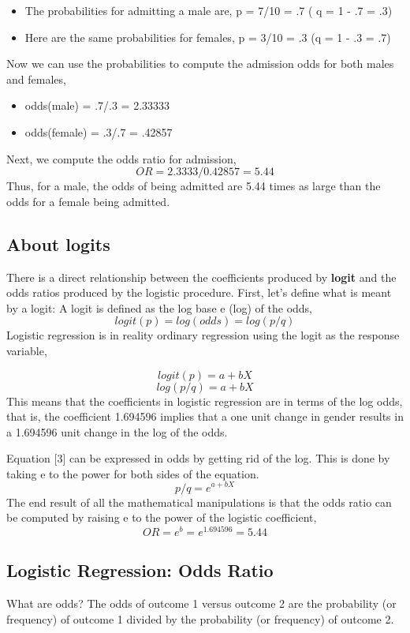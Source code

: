 \documentclass[12pt]{article}
\begin{document}
\begin{itemize}
\item The probabilities for admitting a male are,
p = 7/10 = .7      ( q = 1 - .7 = .3)
\item Here are the same probabilities for females,
p = 3/10 = .3       (q = 1 - .3 = .7)
\end{itemize}
Now we can use the probabilities to compute the admission odds for both males and females,
\begin{itemize}
\item odds(male) = .7/.3 = 2.33333
\item odds(female) = .3/.7 = .42857
\end{itemize}
Next, we compute the odds ratio for admission,
\[OR = 2.3333/0.42857 = 5.44\]
Thus, for a male, the odds of being admitted are 5.44 times as large than the odds for a female being admitted.

\subsection{About logits}


There is a direct relationship between the coefficients produced by \textbf{logit} and the odds ratios produced by the logistic procedure.  First, let's define what is meant by a logit:  A logit is defined as the log base e (log) of the odds,
\[logit(p) = log(odds) = log(p/q)\]
Logistic regression is in reality ordinary regression using the logit as the response variable,

\[logit(p) = a + bX\]
\[log(p/q) = a + bX\]
This means that the coefficients in logistic regression are in terms of the log odds, that is, the coefficient 1.694596 implies that a one unit change in gender results in a 1.694596 unit change in the log of the odds.  

Equation [3] can be expressed in odds by getting rid of the log.  This is done by taking e to the power for both sides of the equation.
\[ p/q = e^{a + bX}\]
The end result of all the mathematical manipulations is that the odds ratio can be computed by raising e to the power of the logistic coefficient,
   \[OR = e^b = e^1.694596 = 5.44\]
\subsection{Logistic Regression: Odds Ratio}
What are odds?
The odds of outcome 1 versus outcome 2 are the probability (or frequency) of outcome 1 divided by the probability (or frequency) of outcome 2.
\end{document}
